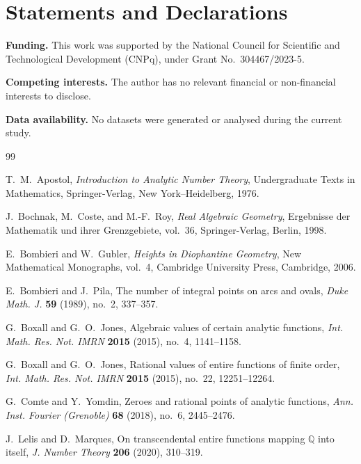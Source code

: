\documentclass[11pt]{amsart}
\theoremstyle{remark}
\newcommand{\Q}{\mathbb{Q}}
\begin{document}
\section*{Statements and Declarations}

\noindent\textbf{Funding.}
This work was supported by the National Council for Scientific and Technological Development (CNPq), under Grant No.~304467/2023-5.

\medskip

\noindent\textbf{Competing interests.}
The author has no relevant financial or non-financial interests to disclose.

\medskip

\noindent\textbf{Data availability.}
No datasets were generated or analysed during the current study.

\begin{thebibliography}{99}

T.~M.~Apostol,
\emph{Introduction to Analytic Number Theory},
Undergraduate Texts in Mathematics,
Springer-Verlag, New York--Heidelberg, 1976.

J.~Bochnak, M.~Coste, and M.-F.~Roy,
\emph{Real Algebraic Geometry},
Ergebnisse der Mathematik und ihrer Grenzgebiete, vol.~36,
Springer-Verlag, Berlin, 1998.

E.~Bombieri and W.~Gubler,
\emph{Heights in Diophantine Geometry},
New Mathematical Monographs, vol.~4,
Cambridge University Press, Cambridge, 2006.

E.~Bombieri and J.~Pila,
The number of integral points on arcs and ovals,
\textit{Duke Math. J.} \textbf{59} (1989), no.~2, 337--357.

G.~Boxall and G.~O.~Jones,
Algebraic values of certain analytic functions,
\textit{Int. Math. Res. Not. IMRN} \textbf{2015} (2015), no.~4, 1141--1158.

G.~Boxall and G.~O.~Jones,
Rational values of entire functions of finite order,
\textit{Int. Math. Res. Not. IMRN} \textbf{2015} (2015), no.~22, 12251--12264.

G.~Comte and Y.~Yomdin,
Zeroes and rational points of analytic functions,
\textit{Ann. Inst. Fourier (Grenoble)} \textbf{68} (2018), no.~6, 2445--2476.

J.~Lelis and D.~Marques,
On transcendental entire functions mapping $\Q$ into itself,
\textit{J. Number Theory} \textbf{206} (2020), 310--319.


\end{thebibliography}
\end{document}
